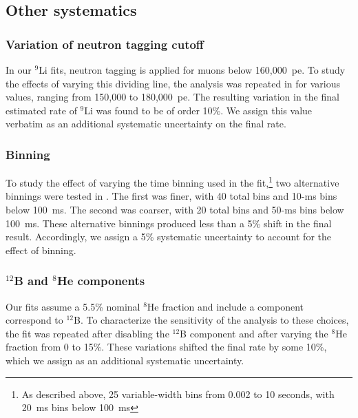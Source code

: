 \documentclass[../thesis.tex]{subfiles}
\begin{document}

\subsection{Other systematics}
\label{sec:bkgLi9FitSyst}

\subsubsection{Variation of neutron tagging cutoff}
\label{sec:bkgLi9NeuTagCutoff}

In our $^9$Li fits, neutron tagging is applied for muons below 160,000~pe. To study the effects of varying this dividing line, the analysis was repeated in \cite{ChrisLi9} for various values, ranging from 150,000 to 180,000~pe. The resulting variation in the final estimated rate of $^9$Li was found to be of order 10\%. We assign this value verbatim as an additional systematic uncertainty on the final rate.

\subsubsection{Binning}
\label{sec:bkgLi9Binning}

To study the effect of varying the time binning used in the fit,\footnote{As described above, 25 variable-width bins from 0.002 to 10 seconds, with 20~ms bins below 100~ms} two alternative binnings were tested in \cite{ChrisLi9}. The first was finer, with 40 total bins and 10-ms bins below 100~ms. The second was coarser, with 20 total bins and 50-ms bins below 100~ms. These alternative binnings produced less than a 5\% shift in the final result. Accordingly, we assign a 5\% systematic uncertainty to account for the effect of binning.

\subsubsection{$^{12}$B and $^8$He components}
\label{sec:bkgLi9B12unc}

Our fits assume a 5.5\% nominal $^8$He fraction and include a component correspond to $^{12}$B.
To characterize the sensitivity of the analysis to these choices, the fit was repeated after disabling the $^{12}$B component and after varying the $^8$He fraction from 0 to 15\%. These variations shifted the final rate by some 10\%, which we assign as an additional systematic uncertainty.
\end{document}
